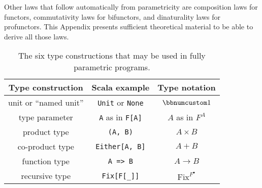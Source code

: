 Other laws that follow automatically from parametricity are composition
laws for functors, commutativity laws for bifunctors, and dinaturality
laws for profunctors. This Appendix presents sufficient theoretical
material to be able to derive all those laws. 

\begin{wraptable}{l}{0.545\columnwidth}%
\begin{centering}
\vspace{-0.2\baselineskip}
\begin{tabular}{|c|c|c|}
\hline 
\textbf{\small{}Type construction} & \textbf{\small{}Scala example} & \textbf{\small{}Type notation}\tabularnewline
\hline 
\hline 
{\small{}unit or \textsf{``}named unit\textsf{''}} & {\small{}}\lstinline!Unit!{\small{} or }\lstinline!None!{\small{} } & {\small{}$\bbnum 1$}\tabularnewline
\hline 
{\small{}type parameter} & {\small{}}\lstinline!A!{\small{} as in }\lstinline!F[A]!{\small{} } & {\small{}$A$ as in $F^{A}$}\tabularnewline
\hline 
{\small{}product type} & {\small{}}\lstinline!(A, B)! & {\small{}$A\times B$}\tabularnewline
\hline 
{\small{}co-product type} & {\small{}}\lstinline!Either[A, B]! & {\small{}$A+B$}\tabularnewline
\hline 
{\small{}function type} & {\small{}}\lstinline!A => B! & {\small{}$A\rightarrow B$}\tabularnewline
\hline 
{\small{}recursive type} & {\small{}}\lstinline!Fix[F[_]]! & {\small{}$\text{Fix}^{F^{\bullet}}$}\tabularnewline
\hline 
\end{tabular}
\par\end{centering}
\caption{The six type constructions
that may be used in fully parametric programs.\label{tab:six-pure-type-constructions}}
\vspace{-0.2\baselineskip}
\end{wraptable}%

